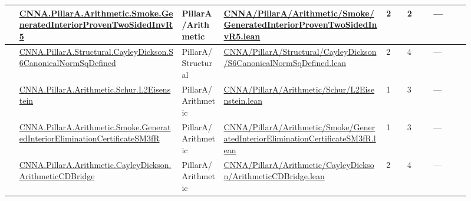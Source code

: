\begin{longtable}{L{0.025\linewidth} L{0.315\linewidth} L{0.08\linewidth} L{0.315\linewidth} L{0.045\linewidth} L{0.055\linewidth} L{0.07\linewidth}}
\hline
{} & \href{run:repo_snapshot/CNNA/PillarA/Arithmetic/Smoke/GeneratedInteriorProvenTwoSidedInvR5.lean}{CNNA.\allowbreak{}PillarA.\allowbreak{}Arithmetic.\allowbreak{}Smoke.\allowbreak{}GeneratedInteriorProvenTwoSidedInvR5} & PillarA/\allowbreak{}Arithmetic & \href{run:repo_snapshot/CNNA/PillarA/Arithmetic/Smoke/GeneratedInteriorProvenTwoSidedInvR5.lean}{CNNA/\allowbreak{}PillarA/\allowbreak{}Arithmetic/\allowbreak{}Smoke/\allowbreak{}GeneratedInteriorProvenTwoSidedInvR5.\allowbreak{}lean} & 2 & 2 & ---\\
\hline
{} & \href{run:repo_snapshot/CNNA/PillarA/Structural/CayleyDickson/S6CanonicalNormSqDefined.lean}{CNNA.\allowbreak{}PillarA.\allowbreak{}Structural.\allowbreak{}CayleyDickson.\allowbreak{}S6CanonicalNormSqDefined} & PillarA/\allowbreak{}Structural & \href{run:repo_snapshot/CNNA/PillarA/Structural/CayleyDickson/S6CanonicalNormSqDefined.lean}{CNNA/\allowbreak{}PillarA/\allowbreak{}Structural/\allowbreak{}CayleyDickson/\allowbreak{}S6CanonicalNormSqDefined.\allowbreak{}lean} & 2 & 4 & ---\\
\hline
{} & \href{run:repo_snapshot/CNNA/PillarA/Arithmetic/Schur/L2Eisenstein.lean}{CNNA.\allowbreak{}PillarA.\allowbreak{}Arithmetic.\allowbreak{}Schur.\allowbreak{}L2Eisenstein} & PillarA/\allowbreak{}Arithmetic & \href{run:repo_snapshot/CNNA/PillarA/Arithmetic/Schur/L2Eisenstein.lean}{CNNA/\allowbreak{}PillarA/\allowbreak{}Arithmetic/\allowbreak{}Schur/\allowbreak{}L2Eisenstein.\allowbreak{}lean} & 1 & 3 & ---\\
\hline
{} & \href{run:repo_snapshot/CNNA/PillarA/Arithmetic/Smoke/GeneratedInteriorEliminationCertificateSM3fR.lean}{CNNA.\allowbreak{}PillarA.\allowbreak{}Arithmetic.\allowbreak{}Smoke.\allowbreak{}GeneratedInteriorEliminationCertificateSM3fR} & PillarA/\allowbreak{}Arithmetic & \href{run:repo_snapshot/CNNA/PillarA/Arithmetic/Smoke/GeneratedInteriorEliminationCertificateSM3fR.lean}{CNNA/\allowbreak{}PillarA/\allowbreak{}Arithmetic/\allowbreak{}Smoke/\allowbreak{}GeneratedInteriorEliminationCertificateSM3fR.\allowbreak{}lean} & 1 & 3 & ---\\
\hline
{} & \href{run:repo_snapshot/CNNA/PillarA/Arithmetic/CayleyDickson/ArithmeticCDBridge.lean}{CNNA.\allowbreak{}PillarA.\allowbreak{}Arithmetic.\allowbreak{}CayleyDickson.\allowbreak{}ArithmeticCDBridge} & PillarA/\allowbreak{}Arithmetic & \href{run:repo_snapshot/CNNA/PillarA/Arithmetic/CayleyDickson/ArithmeticCDBridge.lean}{CNNA/\allowbreak{}PillarA/\allowbreak{}Arithmetic/\allowbreak{}CayleyDickson/\allowbreak{}ArithmeticCDBridge.\allowbreak{}lean} & 2 & 4 & ---\\

\end{longtable}
